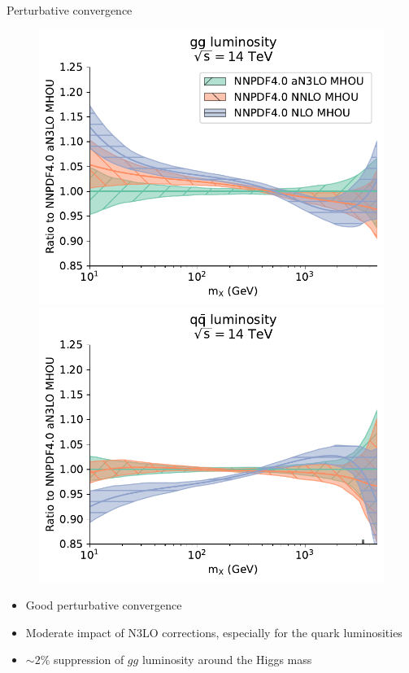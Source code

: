 \documentclass[aspectratio=169, 9pt,t]{beamer}
\begin{document}
\begin{frame}{Perturbative convergence}
  \begin{figure}[!t]
    \includegraphics[width=.4\textwidth]{figures/gg_plot_lumi1d_convergence.pdf}
    \includegraphics[width=.4\textwidth]{figures/qqbar_plot_lumi1d_convergence.pdf}
  \end{figure}
  \begin{itemize}
    \item Good perturbative convergence
    \item Moderate impact of N3LO corrections, especially for the quark luminosities
    \item $\sim2\%$ suppression of $gg$ luminosity around the Higgs mass
  \end{itemize}
\end{frame}
\end{document}
